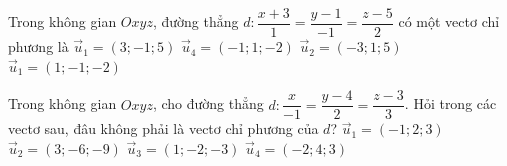 \begin{ex}%
	Trong không gian $Oxyz$, đường thẳng $d:\dfrac{x+3}{1}=\dfrac{y-1}{-1}=\dfrac{z-5}{2}$ có một vectơ chỉ phương là
	\choice
		{$\overrightarrow{u}_1=\left(3;-1; 5\right)$}
		{\True $\overrightarrow{u}_4=\left(-1; 1;-2\right)$}
		{$\overrightarrow{u}_2=\left(-3; 1; 5\right)$}
		{$\overrightarrow{u}_1=\left(1;-1;-2\right)$}
\end{ex}

\begin{ex}%
	Trong không gian $Oxyz$, cho đường thẳng $d:\dfrac{x}{-1}=\dfrac{y-4}{2}=\dfrac{z-3}{3}$. Hỏi trong các vectơ sau, đâu không phải là vectơ chỉ phương của $d$?
	\choice
		{$\overrightarrow{u}_1=\left(-1;2;3\right)$}
		{$\overrightarrow{u}_2=\left(3;-6;-9\right)$}
		{$\overrightarrow{u}_3=\left(1;-2;-3\right)$}
		{\True $\overrightarrow{u}_4=\left(-2;4;3\right)$}
\end{ex}
 

 

